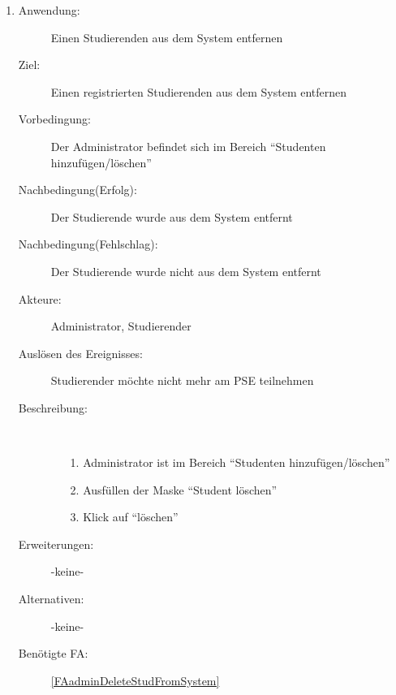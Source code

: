 \documentclass[parskip=full]{scrartcl}
\newcommand{\swtLabel}[1]{\textbf{/#1\arabic*0/}}
\begin{document}
\begin{enumerate} [label=\swtLabel{A}]
  \item \label{UCadminDeleteStudierender}
    \begin{description}
  	\item[Anwendung:] Einen Studierenden aus dem System entfernen
  	\item[Ziel:] Einen registrierten Studierenden aus dem System entfernen
  	\item[Vorbedingung:] Der Administrator befindet sich im Bereich
  	\enquote{Studenten hinzufügen/löschen}
  	\item[Nachbedingung(Erfolg):] Der Studierende wurde aus dem System entfernt
  	\item[Nachbedingung(Fehlschlag):] Der Studierende wurde nicht aus dem System
  	entfernt
  	\item[Akteure:] Administrator, Studierender
  	\item[Auslösen des Ereignisses:] Studierender möchte nicht mehr am PSE
  	teilnehmen
  	\item[Beschreibung:]~
  	\begin{enumerate}
  	  \item[1.] Administrator ist im Bereich \enquote{Studenten
  	  hinzufügen/löschen}
      \item[2.] Ausfüllen der Maske \enquote{Student löschen}
      \item[3.] Klick auf \enquote{löschen}
  	\end{enumerate}
  	\item[Erweiterungen:] -keine-
  	\item[Alternativen:] -keine-
  	\item[Benötigte FA:] \ref{FAadminDeleteStudFromSystem}
  \end{description}
  

\end{enumerate}
\end{document}
